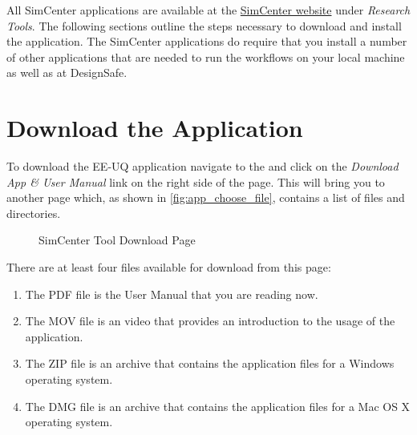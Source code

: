 All SimCenter applications are available at
the \href{https://simcenter.designsafe-ci.org/research-tools/overview/}{SimCenter
website} under \emph{Research Tools}. The following sections outline
the steps necessary to download and install the \getsoftwarename{}
application. The SimCenter applications do require that you install a
number of other applications that are needed to run the workflows on
your local machine as well as at DesignSafe. \\


\section{Download the Application}


To download the EE-UQ application navigate to
the  and click on
the \emph{Download App \& User Manual} link on the right side of the
page. This will bring you to another page which, as shown
in \autoref{fig:app_choose_file}, contains a list of files and
directories.


\begin{figure}[!htbp]
  \caption{SimCenter Tool Download Page}
  \label{fig:app_choose_file}
\end{figure}

There are at least four files available for download from this page: 
\begin{enumerate}
    \item The PDF file is the User Manual that you are reading now.
    \item The MOV file is an video that provides an introduction to the usage of the application.
    \item The ZIP file is an archive that contains the application files for a Windows operating system.
    \item The DMG file is an archive that contains the application files for a Mac OS X operating system.
\end{enumerate}

